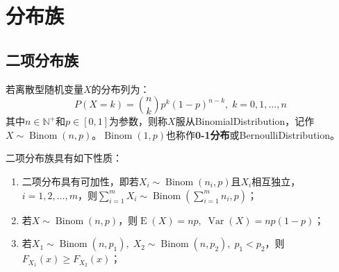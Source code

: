 \section{分布族}

\subsection{二项分布族}
\begin{definition}
	若离散型随机变量$X$的分布列为：
	\begin{equation*}
		P(X=k)=\binom{n}{k}p^k(1-p)^{n-k},\;k=0,1,\dots,n
	\end{equation*}
	其中$n\in\mathbb{N}^+$和$p\in[0,1]$为参数，则称$X$服从\gls{BinomialDistribution}，记作$X\sim\operatorname{Binom}(n,p)$。$\operatorname{Binom}(1,p)$也称作\textbf{0-1分布}或\gls{BernoulliDistribution}。
\end{definition}
\begin{property}\label{prop:Binom}
	二项分布族具有如下性质：
	\begin{enumerate}
		\item 二项分布具有可加性，即若$X_i\sim\operatorname{Binom}(n_i,p)$且$X_i$相互独立，$i=1,2,\dots,m$，则$\sum\limits_{i=1}^{m}X_i\sim\operatorname{Binom}\left(\sum\limits_{i=1}^{m}n_i,p\right)$；
		\item 若$X\sim\operatorname{Binom}(n,p)$，则$\operatorname{E}(X)=np,\;\operatorname{Var}(X)=np(1-p)$；
		\item 若$X_1\sim\operatorname{Binom}(n,p_1),\;X_2\sim\operatorname{Binom}(n,p_2),\;p_1<p_2$，则$F_{X_1}(x)\geqslant F_{X_2}(x)$；
	\end{enumerate}
\end{property}
